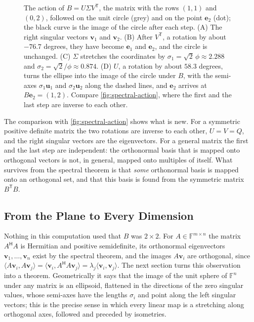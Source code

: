 \begin{figure}
\caption{The action of $B=U\Sigma V^{\mathsf T}$, the matrix with the rows $(1,1)$ and $(0,2)$, followed on the unit circle (grey) and on the point $\mathbf e_2$ (dot); the black curve is the image of the circle after each step. (A) The right singular vectors $\mathbf v_1$ and $\mathbf v_2$. (B) After $V^{\mathsf T}$, a rotation by about $-76.7$ degrees, they have become $\mathbf e_1$ and $\mathbf e_2$, and the circle is unchanged. (C) $\Sigma$ stretches the coordinates by $\sigma_1=\sqrt2\,\phi\approx2.288$ and $\sigma_2=\sqrt2/\phi\approx0.874$. (D) $U$, a rotation by about $58.3$ degrees, turns the ellipse into the image of the circle under $B$, with the semi-axes $\sigma_1\mathbf u_1$ and $\sigma_2\mathbf u_2$ along the dashed lines, and $\mathbf e_2$ arrives at $B\mathbf e_2=(1,2)$. Compare \cref{fig:spectral-action}, where the first and the last step are inverse to each other.\label{fig:svd-action}}
\end{figure}

The comparison with \cref{fig:spectral-action} shows what is new. For a symmetric positive definite matrix the two rotations are inverse to each other, $U=V=Q$, and the right singular vectors are the eigenvectors. For a general matrix the first and the last step are independent: the orthonormal basis that is mapped onto orthogonal vectors is not, in general, mapped onto multiples of itself. What survives from the spectral theorem is that \emph{some} orthonormal basis is mapped onto an orthogonal set, and that this basis is found from the symmetric matrix $B^{\mathsf T}B$.

\subsection{From the Plane to Every Dimension}

Nothing in this computation used that $B$ was $2\times2$. For $A\in\mathbb F^{m\times n}$ the matrix $A^{\mathsf H}A$ is Hermitian and positive semidefinite, its orthonormal eigenvectors $\mathbf v_1,\ldots,\mathbf v_n$ exist by the spectral theorem, and the images $A\mathbf v_i$ are orthogonal, since $\langle A\mathbf v_i,A\mathbf v_j\rangle=\langle\mathbf v_i,A^{\mathsf H}A\mathbf v_j\rangle=\lambda_j\langle\mathbf v_i,\mathbf v_j\rangle$. The next section turns this observation into a theorem. Geometrically it says that the image of the unit sphere of $\mathbb F^n$ under any matrix is an ellipsoid, flattened in the directions of the zero singular values, whose semi-axes have the lengths $\sigma_i$ and point along the left singular vectors; this is the precise sense in which every linear map is a stretching along orthogonal axes, followed and preceded by isometries.

